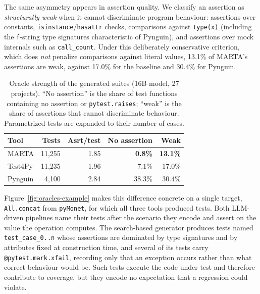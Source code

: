 The same asymmetry appears in assertion quality. We classify an assertion as
\emph{structurally weak} when it cannot discriminate program behaviour: assertions
over constants, \texttt{isinstance}/\texttt{hasattr} checks, comparisons against
\texttt{type(x)} (including the \texttt{f}-string type signatures characteristic of
Pynguin), and assertions over mock internals such as \texttt{call\_count}. Under this
deliberately conservative criterion, which does \emph{not} penalize comparisons
against literal values, 13.1\% of MARTA's assertions are weak, against 17.0\% for the
baseline and 30.4\% for Pynguin.

\begin{table}[htpb]
\centering
\caption{Oracle strength of the generated suites (16B model, 27 projects).
``No assertion'' is the share of test functions containing no assertion or
\texttt{pytest.raises}; ``weak'' is the share of assertions that cannot
discriminate behaviour. Parametrized tests are expanded to their number of cases.}
\label{tab:oracles}
\begin{tabular}{lrrrr}
\hline
\textbf{Tool} & \textbf{Tests} & \textbf{Asrt/test} & \textbf{No assertion} & \textbf{Weak} \\
\hline
MARTA            & 11{,}255 & 1.85 & \textbf{0.8\%}  & \textbf{13.1\%} \\
Test4Py          & 11{,}235 & 1.96 & 7.1\%           & 17.0\% \\
Pynguin          &  4{,}100 & 2.84 & 38.3\%          & 30.4\% \\
\hline
\end{tabular}
\end{table}

Figure~\ref{fig:oracles-example} makes this difference concrete on a single target,
\texttt{All.concat} from \texttt{pyMonet}, for which all three tools produced tests.
Both LLM-driven pipelines name their tests after the scenario they encode and assert
on the value the operation computes. The search-based generator produces tests named
\texttt{test\_case\_0..n} whose assertions are dominated by type signatures and by
attributes fixed at construction time, and several of its tests carry
\texttt{@pytest.mark.xfail}, recording only that an exception occurs rather than what
correct behaviour would be. Such tests execute the code under test and therefore
contribute to coverage, but they encode no expectation that a regression could
violate.

